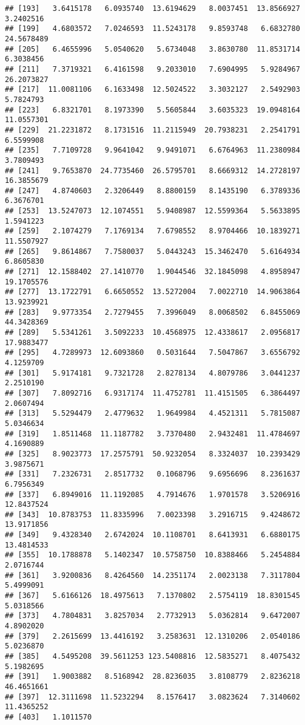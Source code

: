 \documentclass[
]{article}
\begin{document}
\begin{verbatim}
## [193]   3.6415178   6.0935740  13.6194629   8.0037451  13.8566927   3.2402516
## [199]   4.6803572   7.0246593  11.5243178   9.8593748   6.6832780  24.5678489
## [205]   6.4655996   5.0540620   5.6734048   3.8630780  11.8531714   6.3038456
## [211]   7.3719321   6.4161598   9.2033010   7.6904995   5.9284967  26.2073827
## [217]  11.0081106   6.1633498  12.5024522   3.3032127   2.5492903   5.7824793
## [223]   6.8321701   8.1973390   5.5605844   3.6035323  19.0948164  11.0557301
## [229]  21.2231872   8.1731516  11.2115949  20.7938231   2.2541791   6.5599908
## [235]   7.7109728   9.9641042   9.9491071   6.6764963  11.2380984   3.7809493
## [241]   9.7653870  24.7735460  26.5795701   8.6669312  14.2728197  16.3855679
## [247]   4.8740603   2.3206449   8.8800159   8.1435190   6.3789336   6.3676701
## [253]  13.5247073  12.1074551   5.9408987  12.5599364   5.5633895   1.5941223
## [259]   2.1074279   7.1769134   7.6798552   8.9704466  10.1839271  11.5507927
## [265]   9.8614867   7.7580037   5.0443243  15.3462470   5.6164934   6.8605830
## [271]  12.1588402  27.1410770   1.9044546  32.1845098   4.8958947  19.1705576
## [277]  13.1722791   6.6650552  13.5272004   7.0022710  14.9063864  13.9239921
## [283]   9.9773354   2.7279455   7.3996049   8.0068502   6.8455069  44.3428369
## [289]   5.5341261   3.5092233  10.4568975  12.4338617   2.0956817  17.9883477
## [295]   4.7289973  12.6093860   0.5031644   7.5047867   3.6556792   4.1259709
## [301]   5.9174181   9.7321728   2.8278134   4.8079786   3.0441237   2.2510190
## [307]   7.8092716   6.9317174  11.4752781  11.4151505   6.3864497   2.0607494
## [313]   5.5294479   2.4779632   1.9649984   4.4521311   5.7815087   5.0346634
## [319]   1.8511468  11.1187782   3.7370480   2.9432481  11.4784697   4.1690889
## [325]   8.9023773  17.2575791  50.9232054   8.3324037  10.2393429   3.9875671
## [331]   7.2326731   2.8517732   0.1068796   9.6956696   8.2361637   6.7956349
## [337]   6.8949016  11.1192085   4.7914676   1.9701578   3.5206916  12.8437524
## [343]  10.8783753  11.8335996   7.0023398   3.2916715   9.4248672  13.9171856
## [349]   9.4328340   2.6742024  10.1108701   8.6413931   6.6880175  13.4814533
## [355]  10.1788878   5.1402347  10.5758750  10.8388466   5.2454884   2.0716744
## [361]   3.9200836   8.4264560  14.2351174   2.0023138   7.3117804   5.4999091
## [367]   5.6166126  18.4975613   7.1370802   2.5754119  18.8301545   5.0318566
## [373]   4.7804831   3.8257034   2.7732913   5.0362814   9.6472007   4.8902020
## [379]   2.2615699  13.4416192   3.2583631  12.1310206   2.0540186   5.0236870
## [385]   4.5495208  39.5611253 123.5408816  12.5835271   8.4075432   5.1982695
## [391]   1.9003882   8.5168942  28.8236035   3.8108779   2.8236218  46.4651661
## [397]  12.3111698  11.5232294   8.1576417   3.0823624   7.3140602  11.4365252
## [403]   1.1011570
\end{verbatim}
\end{document}
